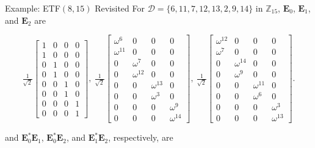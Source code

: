 \documentclass[12pt]{beamer}
\newcommand{\bbZ}{\mathbb{Z}}
\newcommand{\bfE}{\mathbf{E}}
\newcommand{\calD}{\mathcal{D}}
\begin{document}
\begin{frame}{Example: ETF$(8,15)$ Revisited}
For $\calD=\{6,11,7,12,13,2,9,14\}$ in $\bbZ_{15}$, $\bfE_0$, $\bfE_1$, and $\bfE_2$ are

\begin{footnotesize}

\begin{equation*}
	\tfrac{1}{\sqrt{2}}\left[\begin{array}{cccc}
	1 & 0 & 0 & 0\\
	1 & 0 & 0 & 0\\
	0 & 1 & 0 & 0\\
	0 & 1 & 0 & 0\\
	0 & 0 & 1 & 0\\
	0 & 0 & 1 & 0\\
	0 & 0 & 0 & 1\\
	0 & 0 & 0 & 1
	\end{array}\right], \ \tfrac{1}{\sqrt{2}}\left[\begin{array}{cccc}
	\omega^6 & 0 & 0 & 0\\
	\omega^{11} & 0 & 0 & 0\\
	0 & \omega^7 & 0 & 0\\
	0 & \omega^{12} & 0 & 0\\
	0 & 0 & \omega^{13} & 0\\
	0 & 0 & \omega^{3} & 0\\
	0 & 0 & 0 & \omega^9\\
	0 & 0 & 0 & \omega^{14}
	\end{array}\right], \ \tfrac{1}{\sqrt{2}}\left[\begin{array}{cccc}
	\omega^{12} & 0 & 0 & 0\\
	\omega^{7} & 0 & 0 & 0\\
	0 & \omega^{14} & 0 & 0\\
	0 & \omega^{9} & 0 & 0\\
	0 & 0 & \omega^{11} & 0\\
	0 & 0 & \omega^6 & 0\\
	0 & 0 & 0 & \omega^3\\
	0 & 0 & 0 & \omega^{13}
	\end{array}\right].
\end{equation*}

and $\bfE_0^*\bfE_1^{}$, $\bfE_0^*\bfE_2^{}$, and $\bfE_1^*\bfE_2^{}$, respectively, are


\end{footnotesize}
\end{frame}
\end{document}
